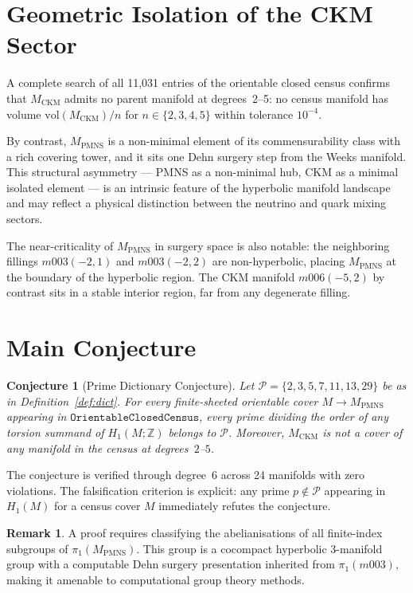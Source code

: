 \documentclass[12pt]{article}
\newtheorem{conjecture}[theorem]{Conjecture}
\theoremstyle{definition}
\newtheorem{remark}[theorem]{Remark}
\begin{document}
\section{Geometric Isolation of the CKM Sector}
\label{sec:geometric}

A complete search of all 11{,}031 entries of the orientable closed census
confirms that $M_{\mathrm{CKM}}$ admits no parent manifold at degrees~2--5:
no census manifold has volume $\mathrm{vol}(M_{\mathrm{CKM}})/n$ for
$n \in \{2,3,4,5\}$ within tolerance $10^{-4}$.

By contrast, $M_{\mathrm{PMNS}}$ is a non-minimal element of its
commensurability class with a rich covering tower, and it sits one Dehn
surgery step from the Weeks manifold. This structural asymmetry --- PMNS
as a non-minimal hub, CKM as a minimal isolated element --- is an
intrinsic feature of the hyperbolic manifold landscape and may reflect a
physical distinction between the neutrino and quark mixing sectors.

The near-criticality of $M_{\mathrm{PMNS}}$ in surgery space is also
notable: the neighboring fillings $m003(-2,1)$ and $m003(-2,2)$ are
non-hyperbolic, placing $M_{\mathrm{PMNS}}$ at the boundary of the
hyperbolic region. The CKM manifold $m006(-5,2)$ by contrast sits in
a stable interior region, far from any degenerate filling.

\section{Main Conjecture}
\label{sec:conjecture}

\begin{conjecture}[Prime Dictionary Conjecture]
\label{conj:main}
Let $\mathcal{P} = \{2,3,5,7,11,13,29\}$ be as in
Definition~\ref{def:dict}. For every finite-sheeted orientable cover
$M \to M_{\mathrm{PMNS}}$ appearing in
$\texttt{OrientableClosedCensus}$, every prime dividing the order of
any torsion summand of $H_1(M;\mathbb{Z})$ belongs to $\mathcal{P}$.
Moreover, $M_{\mathrm{CKM}}$ is not a cover of any manifold in the
census at degrees~$2$--$5$.
\end{conjecture}

The conjecture is verified through degree~6 across 24 manifolds with
zero violations. The falsification criterion is explicit: any prime
$p \notin \mathcal{P}$ appearing in $H_1(M)$ for a census cover $M$
immediately refutes the conjecture.

\begin{remark}
A proof requires classifying the abelianisations of all finite-index
subgroups of $\pi_1(M_{\mathrm{PMNS}})$. This group is a cocompact
hyperbolic 3-manifold group with a computable Dehn surgery presentation
inherited from $\pi_1(m003)$, making it amenable to computational
group theory methods.
\end{remark}
\end{document}
